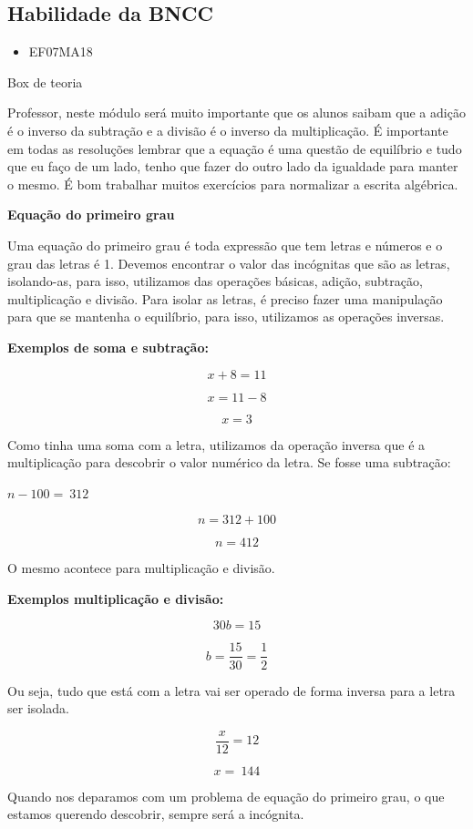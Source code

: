 \subsection{Habilidade da BNCC }
\begin{itemize}
\item EF07MA18
\end{itemize}

Box de teoria

Professor, neste módulo será muito importante que os alunos saibam que a
adição é o inverso da subtração e a divisão é o inverso da
multiplicação. É importante em todas as resoluções lembrar que a equação
é uma questão de equilíbrio e tudo que eu faço de um lado, tenho que
fazer do outro lado da igualdade para manter o mesmo. É bom trabalhar
muitos exercícios para normalizar a escrita algébrica.

\textbf{Equação do primeiro grau}

Uma equação do primeiro grau é toda expressão que tem letras e números e
o grau das letras é 1. Devemos encontrar o valor das incógnitas que são
as letras, isolando-as, para isso, utilizamos das operações básicas,
adição, subtração, multiplicação e divisão. Para isolar as letras, é
preciso fazer uma manipulação para que se mantenha o equilíbrio, para
isso, utilizamos as operações inversas.

\textbf{Exemplos de soma e subtração:}

$$x + 8 = 11$$

$$x = 11 - 8$$

$$x = 3$$

Como tinha uma soma com a letra, utilizamos da operação inversa que é a
multiplicação para descobrir o valor numérico da letra. Se fosse uma
subtração:

$n - 100 = \ 312$

$$n = 312 + 100$$

$$n = 412$$

O mesmo acontece para multiplicação e divisão.

\textbf{Exemplos multiplicação e divisão:}

$$30b = 15$$

$$b = \frac{15}{30} = \frac{1}{2}$$

Ou seja, tudo que está com a letra vai ser operado de forma inversa para
a letra ser isolada.

$$\frac{x}{12} = 12$$

$$x = \ 144$$

Quando nos deparamos com um problema de equação do primeiro grau, o que
estamos querendo descobrir, sempre será a incógnita.

